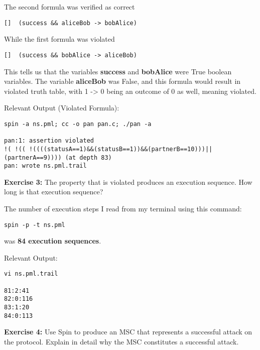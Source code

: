 \documentclass{article}
\theoremstyle{theorem}
\theoremstyle{definition}
\theoremstyle{remark}
\begin{document}
The second formula was verified as correct
\begin{verbatim}
[]  (success && aliceBob -> bobAlice)
\end{verbatim}

\noindent\newline While the first formula was violated
\begin{verbatim}
[]  (success && bobAlice -> aliceBob)
\end{verbatim}


\noindent\newline\newline This tells us that the variables \textbf{success} and \textbf{bobAlice} were True boolean variables. The variable \textbf{aliceBob} was False, and this formula would result in violated truth table, with 1 -> 0 being an outcome of 0 as well, meaning violated.

\noindent\newline Relevant Output (Violated Formula):
\begin{verbatim}
spin -a ns.pml; cc -o pan pan.c; ./pan -a

pan:1: assertion violated  
!( !(( !((((statusA==1)&&(statusB==1))&&(partnerB==10)))||(partnerA==9)))) (at depth 83)
pan: wrote ns.pml.trail

\end{verbatim}


\noindent\newline\textbf{Exercise 3:}
The property that is violated produces an execution sequence. How long is that execution sequence?

\noindent\newline The number of execution steps I read from my terminal using this command:
\begin{verbatim}
spin -p -t ns.pml
\end{verbatim}

\noindent was \textbf{84 execution sequences}. 

\noindent\newline Relevant Output:
\begin{verbatim}
vi ns.pml.trail

81:2:41
82:0:116
83:1:20
84:0:113
\end{verbatim}



\noindent\newline\textbf{Exercise 4:}
Use Spin to produce an MSC that represents a successful attack on the protocol. Explain in detail why the MSC constitutes a successful attack.
\end{document}
